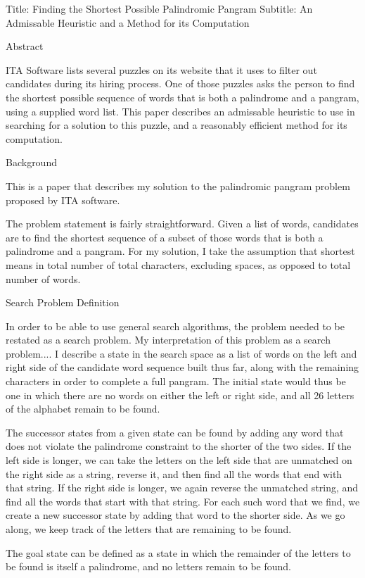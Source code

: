 Title: Finding the Shortest Possible Palindromic Pangram
Subtitle: An Admissable Heuristic and a Method for its Computation

Abstract

ITA Software lists several puzzles on its website that it uses to
filter out candidates during its hiring process. One of those puzzles
asks the person to find the shortest possible sequence of words that
is both a palindrome and a pangram, using a supplied word list. This 
paper describes an admissable heuristic to use in searching for a
solution to this puzzle, and a reasonably efficient method for its 
computation.

Background

This is a paper that describes my solution to the palindromic pangram
problem proposed by ITA software.

The problem statement is fairly straightforward. Given a list of
words, candidates are to find the shortest sequence of a subset
of those words that is both a palindrome and a pangram. For my
solution, I take the assumption that shortest means in total number of
total characters, excluding spaces, as opposed to total number of
words.

Search Problem Definition

In order to be able to use general search algorithms, the problem
needed to be restated as a search problem. My interpretation of this
problem as a search problem.... I describe a state in the search space
as a list of words on the left and right side of the candidate word
sequence built thus far, along with the remaining characters in order
to complete a full pangram. The initial state would thus be one in
which there are no words on either the left or right side, and all 26
letters of the alphabet remain to be found.

The successor states from a given state can be found by adding any
word that does not violate the palindrome constraint to the shorter of
the two sides. If the left side is longer, we can take the letters on
the left side that are unmatched on the right side as a string,
reverse it, and then find all the words that end with that string. If
the right side is longer, we again reverse the unmatched string, and
find all the words that start with that string. For each such word
that we find, we create a new successor state by adding that word to
the shorter side. As we go along, we keep track of the letters that
are remaining to be found.

The goal state can be defined as a state in which the remainder of the
letters to be found is itself a palindrome, and no letters remain to
be found.

